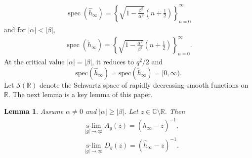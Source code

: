 \documentclass[12pt,dvipdfmx]{article}
\newtheorem{lemma}[theorem]{Lemma}
\newcommand{\RR}{\mathbb{R}}
\newcommand{\CC}{\mathbb{C}}
\newcommand{\spec}{\mathrm{spec}}
\begin{document}
\begin{align*}
    \operatorname{spec}(\hat{h}_\infty)
    =
    \left\{
        \sqrt{1 - \frac{\beta^2}{\alpha^2}}
        \left(n + \frac12\right)
    \right\}_{n=0}^\infty
\end{align*}
and 
for $|\alpha|<|\beta|$, %
\begin{align*}
    \operatorname{spec}(\check{h}_\infty)
    =
    \left\{
        \sqrt{1 - \frac{\alpha^2}{\beta^2}}
        \left(n + \frac12\right)
    \right\}_{n=0}^\infty.
\end{align*}
At the critical value $|\alpha|=|\beta|$, it reduces to $q^2/2$ and 
\[\spec(\hat{h}_\infty) = \spec(\check{h}_\infty)=[0,\infty).\] Let $\mathscr{S}(\RR)$ denote the Schwartz space of rapidly decreasing smooth functions on $\RR$. The next lemma is a key lemma of this paper.
%
\begin{lemma}\label{lem:diag_conv}
Assume $\alpha\ne0$ and $|\alpha|\ge|\beta|$. Let $z\in\CC\setminus\RR$. 
Then 
\begin{align*}
&\operatorname*{s-lim}_{|g|\to\infty} A_g(z)=(\hat{h}_\infty-z)^{-1},\\
&\operatorname*{s-lim}_{|g|\to\infty} D_g(z)=(\hat{h}_\infty-z)^{-1}.
\end{align*}
\end{lemma}
%
\end{document}
